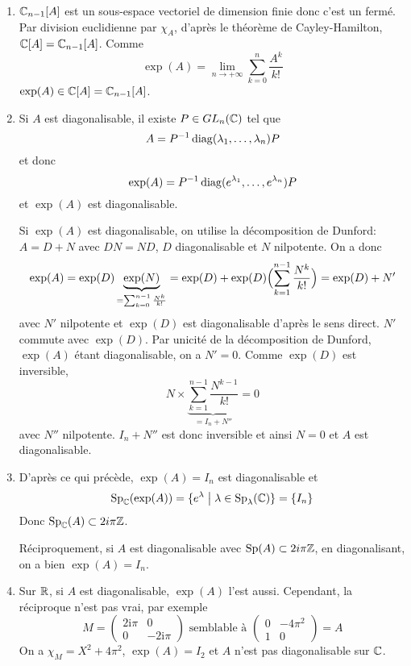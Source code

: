 \begin{solution}
	\phantom{}
	\begin{enumerate}
		\item $\mathbb{C}_{n-1}[A]$ est un sous-espace vectoriel de dimension finie donc c'est un fermé. Par division euclidienne par $\chi_{A}$, d'après le théorème de Cayley-Hamilton, $\mathbb{C}[A]=\mathbb{C}_{n-1}[A]$. Comme 
		$$\exp(A)=\lim\limits_{n\to+\infty}\sum_{k=0}^{n}\frac{A^{k}}{k!}$$
		$\exp(A)\in \mathbb{C}[A]=\mathbb{C}_{n-1}[A]$.

		\item Si $A$ est diagonalisable, il existe $P\in GL_{n}(\mathbb{C})$ tel que 
		$$A=P^{-1}\operatorname{diag}(\lambda_{1},\dots,\lambda_{n})P$$
		et donc 
		$$\exp(A)=P^{-1}\operatorname{diag}(e^{\lambda_{1}},\dots,e^{\lambda_{n}})P$$
		et $\exp(A)$ est diagonalisable.

		Si $\exp(A)$ est diagonalisable, on utilise la décomposition de Dunford: $A=D+N$ avec $DN=ND$, $D$ diagonalisable et $N$ nilpotente. On a donc 
		$$\exp(A)=\exp(D)\underbrace{\exp(N)}_{=\sum_{k=0}^{n-1}\frac{N^{k}}{k!}}=\exp(D)+\exp(D)\Bigl(\sum_{k=1}^{n-1}\frac{N^{k}}{k!}\Bigr)=\exp(D)+N'$$
		avec $N'$ nilpotente et $\exp(D)$ est diagonalisable d'après le sens direct. $N'$ commute avec $\exp(D)$. Par unicité de la décomposition de Dunford, $\exp(A)$ étant diagonalisable, on a $N'=0$. Comme $\exp(D)$ est inversible, 
		$$N\times\underbrace{\sum_{k=1}^{n-1}\frac{N^{k-1}}{k!}}_{=I_{n}+N''}=0$$
		avec $N''$ nilpotente. $I_{n}+N''$ est donc inversible et ainsi $N=0$ et $A$ est diagonalisable.

		\item D'après ce qui précède, $\exp(A)=I_{n}$ est diagonalisable et 
		$$\operatorname{Sp}_{\mathbb{C}}(\exp(A))=\{e^{\lambda}\bigm|\lambda\in\operatorname{Sp}_{\lambda}(\mathbb{C})\}=\{I_{n}\}$$
		Donc $\operatorname{Sp}_{\mathbb{C}}(A)\subset 2i\pi\mathbb{Z}$.

		Réciproquement, si $A$ est diagonalisable avec $\operatorname{Sp}(A)\subset 2i\pi\mathbb{Z}$, en diagonalisant, on a bien $\exp(A)=I_{n}$.

		\item Sur $\mathbb{R}$, si $A$ est diagonalisable, $\exp(A)$ l'est aussi. Cependant, la réciproque n'est pas vrai, par exemple
		$$M=\begin{pmatrix}
			2\mathrm{i}\pi & 0\\
			0 & -2\mathrm{i}\pi
		\end{pmatrix}\text{  semblable à }
		\begin{pmatrix}
			0 & -4\pi^{2}\\
			1 & 0
		\end{pmatrix}=A$$
		On a $\chi_{M}=X^{2}+4\pi^{2}$, $\exp(A)=I_{2}$ et $A$ n'est pas diagonalisable sur $\mathbb{C}$.
	\end{enumerate}
\end{solution}

